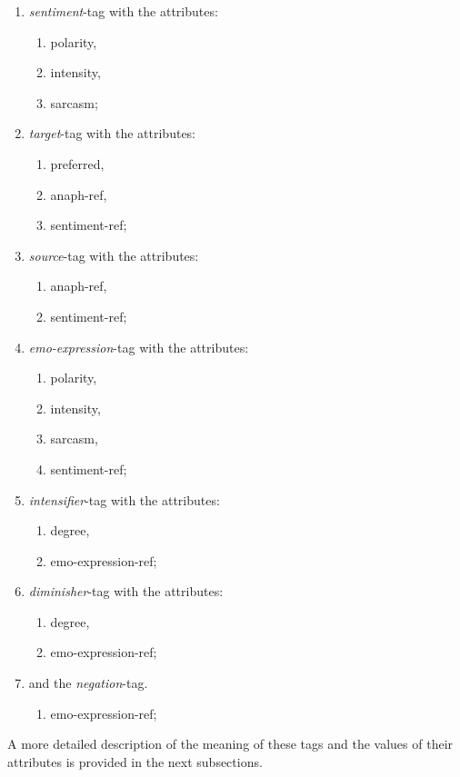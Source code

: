 \documentclass[11pt,a4paper]{article}
\begin{document}
\begin{multicols}{2}
  \begin{enumerate}
  \item \textit{sentiment}-tag with the attributes:
    \begin{enumerate}
    \item polarity,
    \item intensity,
    \item sarcasm;
    \end{enumerate}
  \item \textit{target}-tag with the attributes:
    \begin{enumerate}
    \item preferred,
    \item anaph-ref,
    \item sentiment-ref;
    \end{enumerate}
  \item \textit{source}-tag with the attributes:
    \begin{enumerate}
    \item anaph-ref,
    \item sentiment-ref;
    \end{enumerate}
  \item \textit{emo-expression}-tag with the attributes:
    \begin{enumerate}
    \item polarity,
    \item intensity,
    \item sarcasm,
    \item sentiment-ref;
    \end{enumerate}
  \item \textit{intensifier}-tag with the attributes:
    \begin{enumerate}
    \item degree,
    \item emo-expression-ref;
    \end{enumerate}
  \item \textit{diminisher}-tag with the attributes:
    \begin{enumerate}
    \item degree,
    \item emo-expression-ref;
    \end{enumerate}
  \item and the \textit{negation}-tag.
    \begin{enumerate}
    \item emo-expression-ref;
    \end{enumerate}
  \end{enumerate}
\end{multicols}
    {\setlength{\parindent}{0pt} A more detailed description of the
      meaning of these tags and the values of their attributes is
      provided in the next subsections.}
\end{document}
